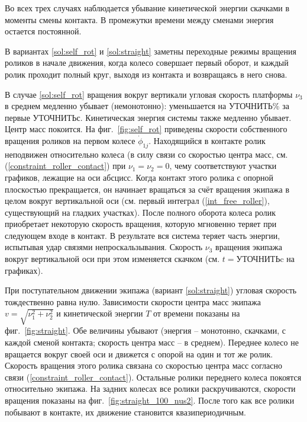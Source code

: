 Во всех трех случаях наблюдается убывание кинетической энергии скачками в моменты смены контакта. В промежутки времени между сменами энергия остается постоянной.

В вариантах \ref{sol:self_rot} и \ref{sol:straight} заметны переходные режимы вращения роликов в начале движения, когда колесо совершает первый оборот, и каждый ролик проходит полный круг, выходя из контакта и возвращаясь в него снова.

В случае \ref{sol:self_rot} вращения вокруг вертикали угловая скорость платформы $\nu_3$ в среднем медленно убывает (немонотонно): уменьшается на УТОЧНИТЬ\%  за первые $\text{УТОЧНИТЬ}$с. Кинетическая энергия системы также медленно убывает. Центр масс покоится. На фиг.~\ref{fig:self_rot} приведены скорости собственного вращения роликов на первом колесе $\dot{\phi}_{1j}$. Находящийся в контакте ролик неподвижен относительно колеса (в силу связи со скоростью центра масс, см. (\ref{constraint_roller_contact}) при $\nu_1 = \nu_2 = 0$, чему соответствуют участки графиков, лежащие на оси абсцисс. Когда контакт этого ролика с опорной плоскостью прекращается, он начинает вращаться за счёт вращения экипажа в целом вокруг вертикальной оси (см. первый интеграл (\ref{int_free_roller}), существующий на гладких участках). После полного оборота колеса ролик приобретает некоторую скорость вращения, которую мгновенно теряет при следующем входе в контакт. В результате вся система теряет часть энергии, испытывая удар связями непроскальзывания. Скорость $\nu_3$ вращения экипажа вокруг вертикальной оси при этом изменяется скачком (см. $t=\text{УТОЧНИТЬ}$c на графиках).

При поступательном движении экипажа (вариант \ref{sol:straight}) угловая скорость тождественно равна нулю. Зависимости скорости центра масс экипажа $v = \sqrt{\nu_1^2+\nu_2^2}$ и кинетической энергии $T$ от времени показаны на фиг.~\ref{fig:straight}. Обе величины убывают (энергия -- монотонно, скачками, с каждой сменой контакта; скорость центра масс -- в среднем). Переднее колесо не вращается вокруг своей оси и движется с опорой на один и тот же ролик. Скорость вращения этого ролика связана со скоростью центра масс согласно связи (\ref{constraint_roller_contact}). Остальные ролики переднего колеса покоятся относительно экипажа. На задних колесах все ролики раскручиваются, скорости вращения показаны на фиг.~\ref{fig:straight_100_nus2}. После того как все ролики побывают в контакте, их движение становится квазипериодичным.

